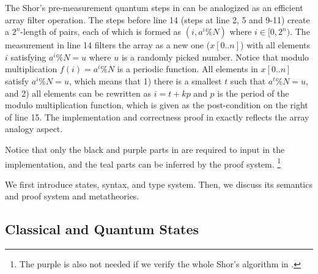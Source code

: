 The Shor's pre-measurement quantum steps in  can be analogized as an efficient array filter operation.
The steps before line 14 (steps at line 2, 5 and 9-11) create a $2^n$-length of pairs, each of which is formed as $(i,a^i \% N)$ where $i\in [0,2^n)$. The measurement in line 14 filters the array as a new one ($x[0..n]$) with all elements $i$ satisfying $a^i \% N=u$ where $u$ is a randomly picked number. Notice that modulo multiplication $f(i)=a^i\%N$ is a periodic function. All elements in $x[0..n]$ satisfy $a^i \% N=u$, which means that 1) there is a smallest $t$ such that $a^t \% N=u$, and 2) all elements can be rewritten as $i=t+kp$ and $p$ is the period of the modulo multiplication function, which is given as the post-condition on the right of line 15.
The implementation and correctness proof in  exactly reflects the array analogy aspect.
Notice that only the black and purple parts in  are required to input in the \qafny implementation, and the teal parts can be inferred by the \qafny proof system. \footnote{The purple is also not needed if we verify the whole Shor's algorithm in .}

We first introduce \qafny states, syntax, and type system. Then, we discuss its semantics and proof system and metatheories.

\subsection {Classical and Quantum States}

